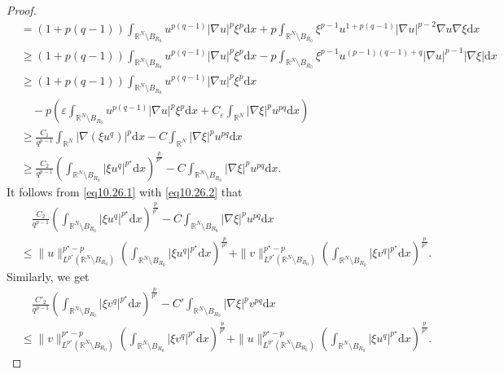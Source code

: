 \documentclass[12pt]{amsart}
\theoremstyle{definition}
\theoremstyle{remark}
\theoremstyle{conclusion}
\theoremstyle{conjecture}
\numberwithin{equation}{section}
\newcommand{\R}{\mathbb{R}}
\begin{document}
\begin{proof}
\begin{align}
           &= (1+p(q-1))\int_{\R^N \setminus B_{R_0}}u^{p(q-1)} |\nabla u|^p \xi^p \mathrm{d}x + p \int_{\R^N \setminus B_{R_0}} \xi^{p-1} u^{1+p(q-1)} |\nabla u|^{p-2} \nabla u \nabla\xi \mathrm{d}x \nonumber\\
           &\geq (1+p(q-1))\int_{\R^N \setminus B_{R_0}}u^{p(q-1)} |\nabla u|^p \xi^p \mathrm{d}x - p \int_{\R^N \setminus B_{R_0}} \xi^{p-1} u^{(p-1)(q-1)+q} |\nabla u|^{p-1} |\nabla\xi| \mathrm{d}x \nonumber\\
           &\geq (1+p(q-1))\int_{\R^N \setminus B_{R_0}}u^{p(q-1)} |\nabla u|^p \xi^p \mathrm{d}x \nonumber\\
           &\quad- p \left(\varepsilon\int_{\R^N \setminus B_{R_0}} u^{p(q-1)} |\nabla u|^p \xi^p \mathrm{d}x+C_\varepsilon\int_{\R^N} |\nabla \xi|^p u^{pq} \mathrm{d}x \right) \nonumber\\
           &\geq \frac{C_1}{q^{p-1}} \int_{\R^N} |\nabla(\xi u^q)|^p \mathrm{d}x - C\int_{\R^N} |\nabla \xi|^p u^{pq} \mathrm{d}x \nonumber\\
           &\geq \frac{C_2}{q^{p-1}} \left(\int_{\R^N \setminus B_{R_0}} |\xi u^q|^{p^{\star}} \mathrm{d}x \right)^\frac{p}{p^{\star}} - C\int_{\R^N \setminus B_{R_0}} |\nabla \xi|^p u^{pq} \mathrm{d}x. \nonumber
\end{align}
It follows from \eqref{eq10.26.1} with \eqref{eq10.26.2} that
\begin{align}\label{eq10.26.3}
&\quad\frac{C_2}{q^{p-1}} \left(\int_{\R^N \setminus B_{R_0}} |\xi u^q|^{p^{\star}} \mathrm{d}x \right)^\frac{p}{p^{\star}} - C\int_{\R^N \setminus B_{R_0}} |\nabla \xi|^p u^{pq} \mathrm{d}x \\
&\leq \|u\|_{L^{p^{\star}}(\R^N \setminus B_{R_0})}^{p^{\star}-p}\left(\int_{\R^N \setminus B_{R_0}} |\xi u^q|^{p^{\star}} \mathrm{d}x \right)^\frac{p}{p^{\star}}+\|v\|_{L^{p^{\star}}(\R^N \setminus B_{R_0})}^{p^{\star}-p}\left(\int_{\R^N \setminus B_{R_0}} |\xi v^q|^{p^{\star}} \mathrm{d}x \right)^\frac{p}{p^{\star}} . \nonumber
\end{align}
Similarly, we get
\begin{align}\label{eq10.26.3-}
&\quad\frac{C'_2}{q^{p-1}} \left(\int_{\R^N \setminus B_{R_0}} |\xi v^q|^{p^{\star}} \mathrm{d}x \right)^\frac{p}{p^{\star}} - C'\int_{\R^N \setminus B_{R_0}} |\nabla \xi|^p v^{pq} \mathrm{d}x \\
&\leq \|v\|_{L^{p^{\star}}(\R^N \setminus B_{R_0})}^{p^{\star}-p}\left(\int_{\R^N \setminus B_{R_0}} |\xi v^q|^{p^{\star}} \mathrm{d}x \right)^\frac{p}{p^{\star}}+\|u\|_{L^{p^{\star}}(\R^N \setminus B_{R_0})}^{p^{\star}-p}\left(\int_{\R^N \setminus B_{R_0}} |\xi u^q|^{p^{\star}} \mathrm{d}x \right)^\frac{p}{p^{\star}} . \nonumber

\end{align}
\end{proof}
\end{document}
